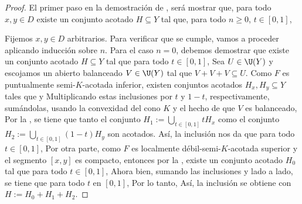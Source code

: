 \begin{proof}
El primer paso en la demostración de , será mostrar que, para todo $x,y\in D$
existe un conjunto acotado $H\subseteq Y$ tal que, para todo $n\geq 0$, $t\in[0,1]$, 

Fijemos $x,y\in D$ arbitrarios. Para verificar que  se cumple, vamos a proceder aplicando
inducción sobre $n.$ 
Para el caso $n=0$, debemos demostrar que existe un conjunto acotado $H\subseteq Y$ tal que para todo
$t\in[0,1]$, 
Sea $U\in\U(Y)$ y escojamos un abierto balanceado $V\in\U(Y)$ tal que $V+V+V\subseteq U$. 
Como $F$ es puntualmente semi-$K$-acotada inferior, existen conjuntos acotados $H_x,H_y\subseteq Y$
tales que 
y
Multiplicando estas inclusiones por $t$ y $1-t$, respectivamente, sumándolas,
usando la convexidad del cono $K$ y el hecho de que $V$ es balanceado,
Por la , se tiene 
que tanto el conjunto $H_1:=\bigcup_{t\in[0,1]} tH_x$ como el
conjunto $H_2:=\bigcup_{t\in[0,1]} (1-t)H_y$
son acotados. Así, la inclusión  nos da que para todo $t\in[0,1]$,
Por otra parte, como $F$ es localmente débil-semi-$K$-acotada superior y el segmento 
$[x,y]$ es compacto, entonces por la , existe un conjunto acotado $H_0$ 
tal que para todo $t\in[0,1]$,
Ahora bien, sumando las inclusiones  y  lado a lado, se tiene que 
para todo $t$ en $[0,1]$, 
Por lo tanto,
Así, la inclusión  se obtiene con $H:=H_0+H_1+H_2$.


\end{proof}
